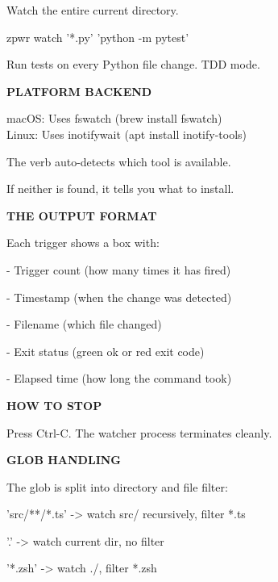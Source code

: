 \documentclass[11pt,a4paper,twoside]{book}
\begin{document}
Watch the entire current directory.

\begin{codebox}
zpwr watch '*.py' 'python -m pytest'\\
\end{codebox}

Run tests on every Python file change. TDD mode.


\vspace{12pt}
{\bfseries\color{neonyellow} PLATFORM BACKEND}\vspace{4pt}

\begin{codebox}
macOS:   Uses fswatch (brew install fswatch)\\
Linux:   Uses inotifywait (apt install inotify-tools)\\
\end{codebox}

The verb auto-detects which tool is available.

If neither is found, it tells you what to install.


\vspace{12pt}
{\bfseries\color{neonyellow} THE OUTPUT FORMAT}\vspace{4pt}

Each trigger shows a box with:

- Trigger count (how many times it has fired)

- Timestamp      (when the change was detected)

- Filename       (which file changed)

- Exit status    (green ok or red exit code)

- Elapsed time   (how long the command took)


\vspace{12pt}
{\bfseries\color{neonyellow} HOW TO STOP}\vspace{4pt}

Press Ctrl-C. The watcher process terminates cleanly.


\vspace{12pt}
{\bfseries\color{neonyellow} GLOB HANDLING}\vspace{4pt}

The glob is split into directory and file filter:

'src/**/*.ts' -> watch src/ recursively, filter *.ts

'.'           -> watch current dir, no filter

'*.zsh'       -> watch ./, filter *.zsh
\end{document}
